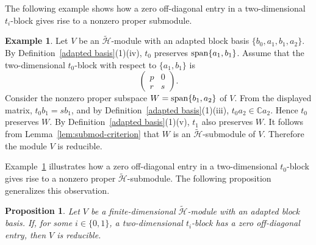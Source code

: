\documentclass[reqno]{amsart}
\newtheorem{proposition}[theorem]{Proposition}
\theoremstyle{definition}
\newtheorem{example}[theorem]{Example}
\begin{document}
The following example shows how a zero off-diagonal entry in a
two-dimensional $t_i$-block gives rise to a nonzero proper submodule.


\begin{example}\label{reducible example}
Let $V$ be an $\widetilde{\mathcal H}$-module with an adapted block basis
$\{b_0,a_1,b_1,a_2\}$.
By Definition~\ref{adapted basis}(1)(iv), $t_0$ preserves
${\rm span}\{a_1,b_1\}$.
Assume that the two-dimensional $t_0$-block with respect to $\{a_1,b_1\}$ is
\begin{equation*}
\begin{pmatrix}
p&0\\
r&s
\end{pmatrix}.
\end{equation*}
Consider the nonzero proper subspace $W={\rm span}\{b_1,a_2\}$ of $V$.
From the displayed matrix, $t_0b_1=sb_1$, and by Definition~\ref{adapted basis}(1)(iii), $t_0a_2 \in \mathbb{C}a_2$. 
Hence $t_0$ preserves $W$.
By Definition~\ref{adapted basis}(1)(v), $t_1$ also preserves $W$. 
It follows from Lemma~\ref{lem:submod-criterion} that $W$ is an $\widetilde{\mathcal H}$-submodule of $V$.
Therefore the module $V$ is reducible.
\end{example}


Example~\ref{reducible example} illustrates how
a zero off-diagonal entry in a two-dimensional $t_0$-block
gives rise to a nonzero proper $\widetilde{\mathcal H}$-submodule.
The following proposition generalizes this observation.


\begin{proposition}\label{reducible condition}
%
Let $V$ be a finite-dimensional $\widetilde{\mathcal H}$-module with an adapted block basis.
If, for some $i\in\{0,1\}$, a two-dimensional $t_i$-block has a zero off-diagonal entry, then $V$ is reducible.
%
\end{proposition}
\end{document}
